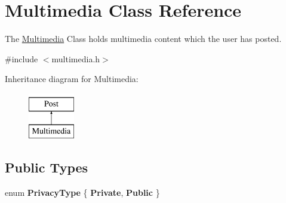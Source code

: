 \hypertarget{classMultimedia}{}\section{Multimedia Class Reference}
\label{classMultimedia}


The \hyperlink{classMultimedia}{Multimedia} Class holds multimedia content which the user has posted.  




{\ttfamily \#include $<$multimedia.\+h$>$}

Inheritance diagram for Multimedia\+:\begin{figure}[H]
\begin{center}
\leavevmode
\includegraphics[height=2.000000cm]{classMultimedia}
\end{center}
\end{figure}
\subsection*{Public Types}
\begin{DoxyCompactItemize}
\item 
enum {\bfseries Privacy\+Type} \{ {\bfseries Private}, 
{\bfseries Public}
 \}\hypertarget{classMultimedia_a0184ece9b710d1c780d41f510f05ef76}{}\label{classMultimedia_a0184ece9b710d1c780d41f510f05ef76}

\end{DoxyCompactItemize}

